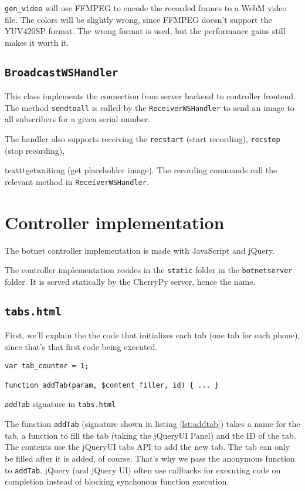\documentclass[a4paper]{report}
\newcommand{\classname}[1]{\texttt{#1}}
\newcommand{\methodname}[1]{\texttt{#1}}
\newcommand{\filename}[1]{\texttt{#1}}
\begin{document}
\methodname{gen\_video} will use FFMPEG to encode the recorded frames to a WebM video file. The colors will be slightly wrong, since FFMPEG doesn't support the YUV420SP format. The wrong format is used, but the performance gains still makes it worth it.

\subsection{\classname{BroadcastWSHandler}}
This class implements the connection from server backend to controller frontend. The method \methodname{sendtoall} is called by the \classname{ReceiverWSHandler} to send an image to all subscribers for a given serial number.

The handler also supports receiving the \texttt{recstart} (start recording), \texttt{recstop} (stop recording), {texttt{getwaitimg} (get placeholder image). The recording commands call the relevant method in \classname{ReceiverWSHandler}.

\section{Controller implementation}
The botnet controller implementation is made with JavaScript and jQuery.

The controller implementation resides in the \filename{static} folder in the \filename{botnetserver} folder. It is served statically by the CherryPy server, hence the name.

\subsection{\filename{tabs.html}}
First, we'll explain the the code that initializes each tab (one tab for each phone), since that's that first code being executed.

\begin{listing}[H]
\begin{verbatim}
var tab_counter = 1;

function addTab(param, $content_filler, id) { ... }
\end{verbatim}
\caption{\methodname{addTab} signature in \filename{tabs.html}}
\label{lst:addtab}
\end{listing}

The function \methodname{addTab} (signature shown in listing \ref{lst:addtab}) takes a name for the tab, a function to fill the tab (taking the jQueryUI Panel) and the ID of the tab. The contents use the jQueryUI tabs API to add the new tab. The tab can only be filled after it is added, of course. That's why we pass the anonymous function to \methodname{addTab}. jQuery (and jQuery UI) often use callbacks for executing code on completion instead of blocking synchonous function execution.

}
\end{document}
